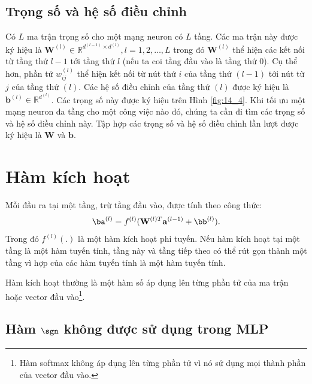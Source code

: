\subsection{Trọng số và hệ số điều chỉnh}
Có $L$ ma trận trọng số cho một mạng neuron có $L$ tầng. Các ma
trận này được ký hiệu là $\mathbf{W}^{(l)} \in \mathbb{R}^{d^{(l-1)}\times
d^{(l)}}, l = 1, 2, \dots, L$ trong đó $\mathbf{W}^{(l)}$ thể hiện các
{kết nối} từ tầng thứ $l-1$ tới tầng thứ $l$ (nếu ta coi tầng đầu vào là
tầng thứ $0$). Cụ thể hơn, phần tử $w^{(l)}_{ij}$ thể hiện kết nối từ nút thứ
$i$ của tầng thứ $(l-1)$ tới nút từ $j$ của tầng thứ $(l)$. Các hệ số điều chỉnh của
tầng thứ $(l)$ được ký hiệu là $\mathbf{b}^{(l)} \in \mathbb{R}^{d^{(l)}}$. Các
trọng số này được ký hiệu trên Hình \ref{fig:14_4}. Khi tối ưu một
mạng neuron đa tầng cho một công việc nào đó, chúng ta cần đi tìm các
trọng số và hệ số điều chỉnh này. Tập hợp các trọng số và hệ số điều chỉnh lần lượt được ký hiệu là
$\mathbf{W}$ và $\mathbf{b}$. 
 
 
\section{Hàm kích hoạt}

 
Mỗi đầu ra tại một tầng, trừ tầng đầu vào, được tính theo công thức:
\begin{equation} 
\ba^{(l)} = f^{(l)}(\mathbf{W}^{(l)T}\mathbf{a}^{(l-1)} + \bb^{(l)}).
\end{equation} 
 Trong đó $f^{(l)}(.)$ là một hàm kích hoạt phi tuyến. Nếu hàm kích hoạt tại một
tầng là một hàm tuyến tính, tầng này và tầng tiếp theo có thể rút gọn thành
một tầng vì {hợp của các hàm tuyến tính là một hàm tuyến tính}.

Hàm kích hoạt thường là một hàm số áp dụng lên {từng phần tử} của ma trận
hoặc vector đầu vào\footnote{Hàm softmax không áp dụng lên từng phần tử vì nó sử dụng mọi thành phần của vector đầu vào.}.

 
 
\subsection{Hàm $\sgn$ không được sử dụng trong MLP}
 
